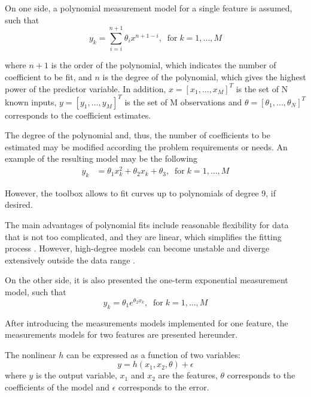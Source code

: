 \documentclass[a4paper, report, oneside, UKenglish]{memoir}
\begin{document}
On one side, a polynomial measurement model for a single feature is assumed, such that
\begin{equation}
    y_k = \sum\limits_{i=i}^{n+1} \theta_{i}x^{n+1-i},  \;\;\mbox{for}\; k = 1,...,M
\end{equation}

where $n+1$ is the order of the polynomial, which indicates the number of coefficient to be fit, and $n$ is the degree of the polynomial, which gives the highest power of the predictor variable. In addition, $x = [x_1,...,x_M]^T$ is the set of N known inputs, $y = [y_1,...,y_M]^T$ is the set of M observations and $\theta = [\theta_1,...,\theta_N]^T$ corresponds to the coefficient estimates.

The degree of the polynomial and, thus, the number of coefficients to be estimated may be modified according the problem requirements or needs. 
An example of the resulting model may be the following
\begin{equation}
\begin{split}
    y_k &= \theta_{1}x^{2}_k + \theta_{2}x_k + \theta_3,    \;\;\mbox{for}\; k = 1,...,M
\end{split}
\end{equation}

However, the toolbox allows to fit curves up to polynomials of degree 9, if desired. 

The main advantages of polynomial fits include reasonable flexibility for data that is not too complicated, and they are linear, which simplifies the fitting process \cite{MathWorksRegression}. However, high-degree models can become unstable and diverge extensively outside the data range \cite{MathWorksRegression}. 

On the other side, it is also presented the one-term exponential measurement model, such that 
\begin{equation}
    y_k = \theta_{1}e^{\theta_{2}x_{k}},  \;\;\mbox{for}\; k = 1,...,M
\end{equation}

After introducing the measurements models implemented for one feature, the measurements models for two features are presented hereunder.

The nonlinear $h$ can be expressed as a function of two variables:
\begin{equation}
    y = h(x_{1},x_{2},\theta) + \epsilon
\end{equation}
where $y$ is the output variable, $x_{1}$ and $x_{2}$ are the features, $\theta$ corresponds to the coefficients of the model and $\epsilon$ corresponds to the error. 
\end{document}
